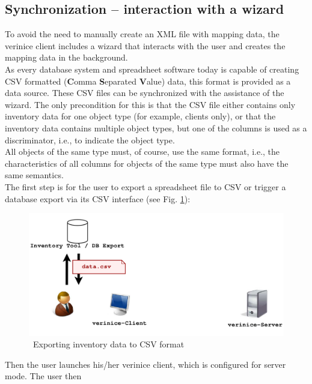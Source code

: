 \documentclass[a4paper,10pt]{book}
\begin{document}
\subsection{Synchronization – interaction with a wizard}
To avoid the need to manually create an XML file with mapping data, the verinice client includes a wizard that
interacts with the user and creates the mapping data in the background.
\newline\\
As every database system and spreadsheet software today is capable of creating CSV formatted (\textbf{C}omma
\textbf{S}eparated \textbf{V}alue) data, this format is provided as a data source. These CSV files can be
synchronized with the assistance of the wizard. The only precondition for this is that the CSV file either
contains only inventory data for one object type (for example, clients only), or that the inventory data
contains multiple object types, but one of the columns is used as a discriminator, i.e., to indicate
the object type.
\newline\\
All objects of the same type must, of course, use the same format, i.e., the characteristics of all columns
for objects of the same type must also have the same semantics.
\newline\\
The first step is for the user to export a spreadsheet file to CSV or trigger a database export via its CSV interface (see Fig. \ref{Exporting inventory data to CSV format}):
\newline
\begin{figure}[htb!]
  \centering
  \includegraphics[scale=.26]{Screenshot/Use_case_verinice_wizard_01_03-en.png}
  \caption{\label{Exporting inventory data to CSV format} \ Exporting inventory data to CSV format}
\end{figure}
\newline
Then the user launches his/her verinice client, which is configured for server mode. The user then
\end{document}
